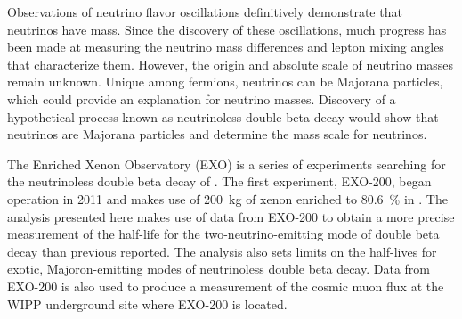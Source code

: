 Observations of neutrino flavor oscillations definitively demonstrate that neutrinos have mass. Since the discovery of these oscillations, much progress has been made at measuring the neutrino mass differences and lepton mixing angles that characterize them. However, the origin and absolute scale of neutrino masses remain unknown. Unique among fermions, neutrinos can be Majorana particles, which could provide an explanation for neutrino masses. Discovery of a hypothetical process known as neutrinoless double beta decay would show that neutrinos are Majorana particles and determine the mass scale for neutrinos.

The Enriched Xenon Observatory (EXO) is a series of experiments searching for the neutrinoless double beta decay of . The first experiment, EXO-200, began operation in 2011 and makes use of \SI{200}{\kg} of xenon enriched to \SI{80.6}{\percent} in . The analysis presented here makes use of data from EXO-200 to obtain a more precise measurement of the half-life for the two-neutrino-emitting mode of double beta decay than previous reported. The analysis also sets limits on the half-lives for exotic, Majoron-emitting modes of neutrinoless double beta decay. Data from EXO-200 is also used to produce a measurement of the cosmic muon flux at the WIPP underground site where EXO-200 is located.
